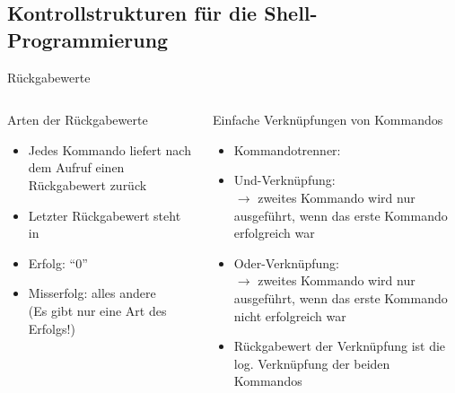 \documentclass[aspectratio=43]{beamer}
\begin{document}
\subsection{Kontrollstrukturen für die Shell-Programmierung}
\begin{frame}{Rückgabewerte}
  \begin{columns}
    \begin{column}{0.4\textwidth}
      \begin{block}{Arten der Rückgabewerte}
        \begin{itemize}
          \item Jedes Kommando liefert nach dem Aufruf einen Rückgabewert zurück
          \item Letzter Rückgabewert steht in 
          \item Erfolg: ``0''
          \item Misserfolg: alles andere\\
               (Es gibt nur eine Art des Erfolgs!)
        \end{itemize}
      \end{block}
    \end{column}
    \begin{column}{0.7\textwidth}
       \begin{block}{Einfache Verknüpfungen von Kommandos}
            \begin{itemize}
              \item Kommandotrenner: \co{;}
              \item Und-Verknüpfung: \co{\&\&}\\
                    $\rightarrow$ zweites Kommando wird nur ausgeführt, wenn das erste Kommando
                    erfolgreich war
              \item Oder-Verknüpfung: \co{||}\\
                    $\rightarrow$ zweites Kommando wird nur ausgeführt, wenn das erste Kommando
                    nicht erfolgreich war
              \item Rückgabewert der Verknüpfung ist die log. Verknüpfung der beiden Kommandos
            \end{itemize}
        \end{block}
    \end{column}
  \end{columns}
\end{frame}
\end{document}
